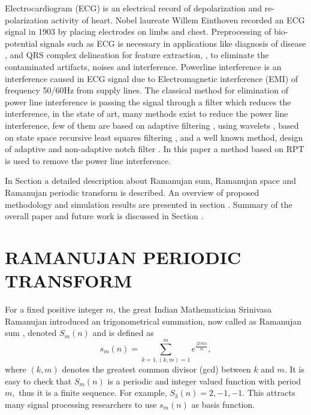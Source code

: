\documentclass[conference]{IEEEtran}
\newcommand{\RNum}[1]{\uppercase\expandafter{\romannumeral #1\relax}}
\begin{document}
Electrocardiogram (ECG) is an electrical record of depolarization and re-polarization activity of heart. Nobel laureate Willem Einthoven recorded an ECG signal in 1903 by placing electrodes on limbs and chest. Preprocessing of bio-potential signals such as ECG is necessary in applications like diagnosis of disease \cite{hosseini2006}, and QRS complex delineation for feature extraction\cite{1275572}, \cite{7383914}, to eliminate the contaminated artifacts, noises and interference. Powerline interference is an interference caused in ECG signal due to Electromagnetic interference (EMI) of frequency 50/60Hz from supply lines. The classical method for elimination of power line interference is passing the signal through a filter which reduces the interference, in the state of art, many methods exist to reduce the power line interference, few of them are based on adaptive filtering \cite{1451965}, using wavelets \cite{5670602}, based on state space recursive least squares filtering \cite{6530021}, and a well known method, design of adaptive and non-adaptive notch filter \cite{477707}. In this paper a method based on RPT is used to remove the power line interference.

In Section \RNum{2} a detailed description about Ramanujan sum, Ramanujan space and Ramanujan periodic transform is described. An overview of proposed methodology and simulation results are presented in section \RNum{3}. Summary of the overall paper and future work is discussed in Section \RNum{4}.

\section{RAMANUJAN PERIODIC TRANSFORM}
For a fixed positive integer $m$, the great Indian Mathematician Srinivasa Ramanujan introduced an trigonometrical summation, now called 
as Ramanujan sum \cite{Ramanujan}, denoted $S_m(n)$ and is defined as
\begin{equation}
\label{eq1}
 s_m(n) = \sum_{k=1,(k,m)=1}^{m}e^{\frac{j2{\pi}kn}{m}},
\end{equation}
where $(k,m)$ denotes the greatest common divisor (gcd) between $k$ and $m$. It is easy to check that $S_m(n)$ is a periodic and integer valued  function with period $m,$ thus it is a finite sequence.  For example, 
$S_3(n)=2,-1,-1.$
This attracts many signal processing researchers to use $s_m (n)$ as basis function. 
\end{document}
